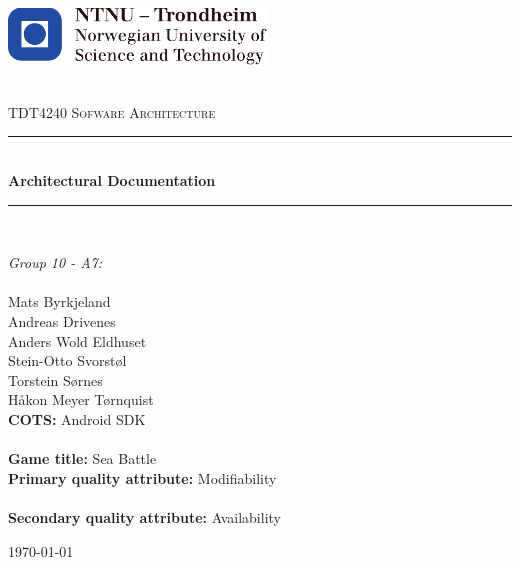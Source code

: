 \begin{titlepage}
\centering

\begin{center}
    \includegraphics[height=1.5cm]{figs/ntnu_logo.pdf}\\[1cm]
\end{center}

\begin{center}

\newcommand{\myauthor}{Mats Byrkjeland\\Andreas Drivenes\\Anders Wold Eldhuset\\Stein-Otto Svorstøl\\Torstein Sørnes\\Håkon Meyer Tørnquist} 
\newcommand{\mytitle}{Architectural Documentation}
\newcommand{\mygroupnumber}{10 - A7}

~\\[1.5cm]

\textsc{\Large TDT4240 Sofware Architecture}\\[0.5cm]

\hrule ~\\[0.2cm]
{\huge \bfseries \mytitle}\\[0.4cm]		%
\hrule ~\\[1.5cm]

\begin{minipage}{0.4\textwidth}
    \centering
	\large
		\emph{Group \mygroupnumber:}\\~\\
		\myauthor\\
		\vspace{2.5cm}
		\textbf{COTS:} Android SDK\\~\\
		\textbf{Game title:} Sea Battle\\
		\vspace{1.5cm}
		\textbf{Primary quality attribute:} Modifiability\\~\\
		\textbf{Secondary quality attribute:} Availability
\end{minipage}

\vfill

{\large \today}

\end{center}
\end{titlepage}


\thispagestyle{empty}
